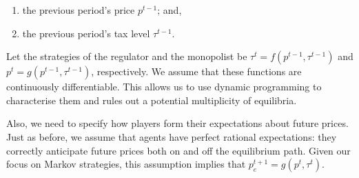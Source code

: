 \begin{enumerate}
\item the previous period's price $p^{t-1}$; and,

\item the previous period's tax level $\tau ^{t-1}$.
\end{enumerate}

Let the strategies of the regulator and the monopolist be $\tau
^{t}=f(p^{t-1},\tau ^{t-1})$ and $p^{t}=g(p^{t-1},\tau ^{t-1})$,
respectively. We assume that these functions are continuously
differentiable. This allows us to use dynamic programming to characterise
them and rules out a potential multiplicity of equilibria.

Also, we need to specify how players form their expectations about future
prices. Just as before, we assume that agents have perfect rational
expectations: they correctly anticipate future prices both on and off the
equilibrium path. Given our focus on Markov strategies, this assumption
implies that $p_{e}^{t+1}=g(p^{t},\tau ^{t})$.

